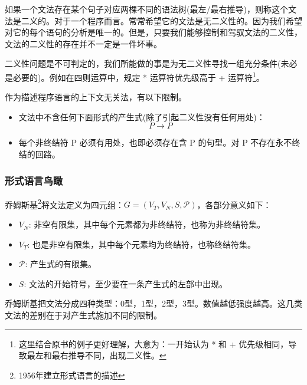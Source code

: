 如果一个文法存在某个句子对应两棵不同的语法树(最左/最右推导)，则称这个文法是二义的。对于一个程序而言。常常希望它的文法是无二义性的。因为我们希望对它的每个语句的分析是唯一的。但是，只要我们能够控制和驾驭文法的二义性，文法的二义性的存在并不一定是一件坏事。

二义性问题是不可判定的，我们所能做的事是为无二义性寻找一组充分条件(未必是必要的)。例如在四则运算中，规定 * 运算符优先级高于 + 运算符\footnote{这里结合原书的例子更好理解，大意为：一开始认为 * 和 + 优先级相同，导致最左和最右推导不同，出现二义性。}。

作为描述程序语言的上下文无关法，有以下限制。

\begin{itemize}
    \item 文法中不含任何下面形式的产生式(除了引起二义性没有任何用处)：
    \[P \rightarrow P\]
    \item 每个非终结符 P 必须有用处，也即必须存在含 P 的句型。对 P 不存在永不终结的回路。
\end{itemize}

\subsubsection{形式语言鸟瞰}

乔姆斯基\footnote{1956年建立形式语言的描述}将文法定义为四元组：$G=(V_T,V_N,S,\mathcal{P})$，各部分意义如下：
\begin{itemize}
    \item $V_N$: 非空有限集，其中每个元素都为非终结符，也称为非终结符集。
    \item $V_T$: 也是非空有限集，其中每个元素均为终结符，也称终结符集。
    \item $\mathcal{P}$: 产生式的有限集。
    \item $S$: 文法的开始符号，至少要在一条产生式的左部中出现。
\end{itemize}

乔姆斯基把文法分成四种类型：0型，1型，2型，3型。数值越低强度越高。这几类文法的差别在于对产生式施加不同的限制。



